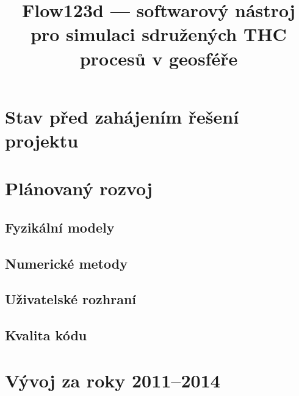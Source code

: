 \documentclass{article}
\begin{document}
\title{Flow123d --- softwarový nástroj pro simulaci sdružených THC procesů v geosféře}
\maketitle


\section{Stav před zahájením řešení projektu}



\section{Plánovaný rozvoj}

\subsection{Fyzikální modely}

\subsection{Numerické metody}

\subsection{Uživatelské rozhraní}

\subsection{Kvalita kódu}




\section{Vývoj za roky 2011--2014}




\end{document}
